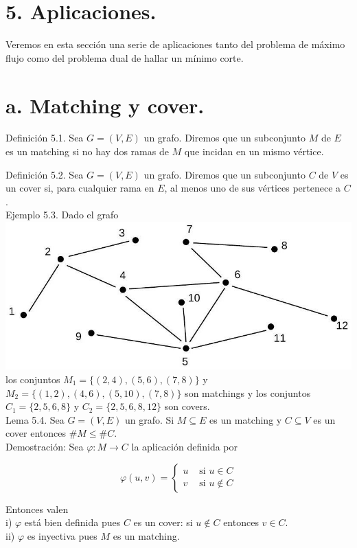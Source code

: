 \documentclass[10pt]{article}
\begin{document}
\section*{5. Aplicaciones.}
Veremos en esta sección una serie de aplicaciones tanto del problema de máximo flujo como del problema dual de hallar un mínimo corte.

\section*{a. Matching y cover.}
Definición 5.1. Sea $G=(V, E)$ un grafo. Diremos que un subconjunto $M$ de $E$ es un matching si no hay dos ramas de $M$ que incidan en un mismo vértice.

Definición 5.2. Sea $G=(V, E)$ un grafo. Diremos que un subconjunto $C$ de $V$ es un cover si, para cualquier rama en $E$, al menos uno de sus vértices pertenece a $C$.\\
Ejemplo 5.3. Dado el grafo\\
\includegraphics[max width=\textwidth, center]{2025_09_05_aa5f7b8425e7dd302062g-14}\\
los conjuntos $M_{1}=\{(2,4),(5,6),(7,8)\}$ y $M_{2}=\{(1,2),(4,6),(5,10),(7,8)\}$ son matchings y los conjuntos $C_{1}=\{2,5,6,8\}$ y $C_{2}=\{2,5,6,8,12\}$ son covers.\\
Lema 5.4. Sea $G=(V, E)$ un grafo. Si $M \subseteq E$ es un matching y $C \subseteq V$ es un cover entonces $\# M \leq \# C$.\\
Demostración: Sea $\varphi: M \longrightarrow C$ la aplicación definida por

$$
\varphi(u, v)= \begin{cases}u & \text { si } u \in C \\ v & \text { si } u \notin C\end{cases}
$$

Entonces valen\\
i) $\varphi$ está bien definida pues $C$ es un cover: si $u \notin C$ entonces $v \in C$.\\
ii) $\varphi$ es inyectiva pues $M$ es un matching.
\end{document}
